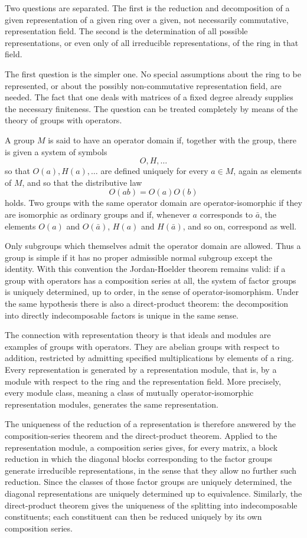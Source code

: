 \documentclass[11pt]{article}
\begin{document}
Two questions are separated. The first is the reduction and
decomposition of a given representation of a given ring over a given,
not necessarily commutative, representation field. The second is the
determination of all possible representations, or even only of all
irreducible representations, of the ring in that field.

The first question is the simpler one. No special assumptions about the
ring to be represented, or about the possibly non-commutative
representation field, are needed. The fact that one deals with matrices
of a fixed degree already supplies the necessary finiteness. The
question can be treated completely by means of the theory of groups with
operators.

A group \(M\) is said to have an operator domain if, together with the
group, there is given a system of symbols \[
  O,H,\ldots
\] so that \(O(a),H(a),\ldots\) are defined uniquely for every
\(a\in M\), again as elements of \(M\), and so that the distributive law
\[
  O(ab)=O(a)O(b)
\] holds. Two groups with the same operator domain are
operator-isomorphic if they are isomorphic as ordinary groups and if,
whenever \(a\) corresponds to \(\bar a\), the elements \(O(a)\) and
\(O(\bar a)\), \(H(a)\) and \(H(\bar a)\), and so on, correspond as
well.

Only subgroups which themselves admit the operator domain are allowed.
Thus a group is simple if it has no proper admissible normal subgroup
except the identity. With this convention the Jordan-Hoelder theorem
remains valid: if a group with operators has a composition series at
all, the system of factor groups is uniquely determined, up to order, in
the sense of operator-isomorphism. Under the same hypothesis there is
also a direct-product theorem: the decomposition into directly
indecomposable factors is unique in the same sense.

The connection with representation theory is that ideals and modules are
examples of groups with operators. They are abelian groups with respect
to addition, restricted by admitting specified multiplications by
elements of a ring. Every representation is generated by a
representation module, that is, by a module with respect to the ring and
the representation field. More precisely, every module class, meaning a
class of mutually operator-isomorphic representation modules, generates
the same representation.

The uniqueness of the reduction of a representation is therefore
answered by the composition-series theorem and the direct-product
theorem. Applied to the representation module, a composition series
gives, for every matrix, a block reduction in which the diagonal blocks
corresponding to the factor groups generate irreducible representations,
in the sense that they allow no further such reduction. Since the
classes of those factor groups are uniquely determined, the diagonal
representations are uniquely determined up to equivalence. Similarly,
the direct-product theorem gives the uniqueness of the splitting into
indecomposable constituents; each constituent can then be reduced
uniquely by its own composition series.
\end{document}
